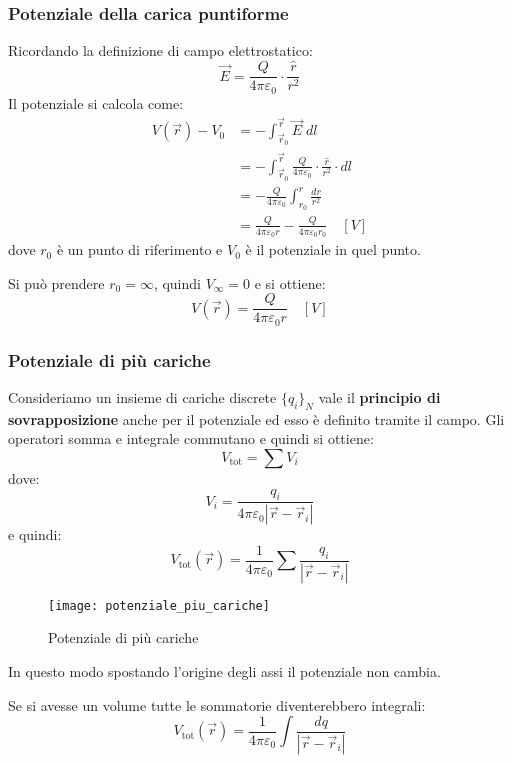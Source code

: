 \documentclass[a4paper]{article}
\begin{document}
\subsubsection{Potenziale della carica puntiforme}
Ricordando la definizione di campo elettrostatico:
\[
  \vec{E} = \frac{Q}{4 \pi \varepsilon_0} \cdot \frac{\hat{r}}{r^2}
\] 
Il potenziale si calcola come:
\[
  \begin{aligned}
    V(\vec{r}) - V_0 &= - \int_{\vec{r}_0}^{\vec{r}} \vec{E} \; dl \\
                     &= - \int_{\vec{r}_0}^{\vec{r}} \frac{Q}{4 \pi \varepsilon_0}
                     \cdot \frac{\hat{r}}{r^2} \cdot  dl \\
                     &= - \frac{Q}{4 \pi \varepsilon_0} \int_{r_0}^{r} \frac{dr}{r^2} \\
                     &= \frac{Q}{4 \pi \varepsilon_0 r} -
                     \frac{Q}{4 \pi \varepsilon_0 r_0} \quad \left[ V \right]
  \end{aligned}
\] 
dove \( r_0 \) è un punto di riferimento e \( V_0 \) è il potenziale in quel punto.

Si può prendere \( r_0 = \infty \), quindi \( V_\infty = 0 \) e si ottiene:
\[
  V(\vec{r}) = \frac{Q}{4 \pi \varepsilon_0 r} \quad \left[ V \right]
\] 

\subsubsection{Potenziale di più cariche}
Consideriamo un insieme di cariche discrete \( \{q_i\}_N \) vale il \textbf{principio
di sovrapposizione} anche per il potenziale ed esso è definito tramite il campo.
Gli operatori somma e integrale commutano e quindi si ottiene:
\[
  V_{\text{tot}} = \sum V_i
\] 
dove:
\[
  V_i = \frac{q_i}{4 \pi \varepsilon_0 |\vec{r} - \vec{r}_i|}
\] 
e quindi:
\[
  V_{\text{tot}}(\vec{r}) = \frac{1}{4 \pi \varepsilon_0} \sum \frac{q_i}{|\vec{r}-\vec{r}_i|}
\] 
\begin{figure}[H]
  \centering
  \texttt{[image: potenziale\_piu\_cariche]}
  \caption{Potenziale di più cariche}
\end{figure}
\noindent
In questo modo spostando l'origine degli assi il potenziale non cambia.

\vspace{1em}
\noindent
Se si avesse un volume tutte le sommatorie diventerebbero integrali:
\[
  V_{\text{tot}}(\vec{r}) = \frac{1}{4 \pi \varepsilon_0} \int \frac{dq}{|\vec{r} - \vec{r}_i|}
\] 
\end{document}
